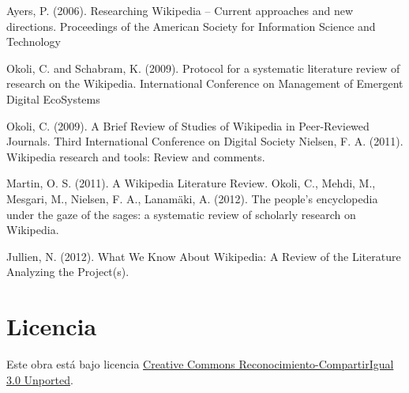 \documentclass[11pt,twocolumn]{article}
\begin{document}
Ayers, P. (2006). Researching Wikipedia -- Current approaches and new directions. Proceedings of the American Society for Information Science and Technology

Okoli, C. and Schabram, K. (2009). Protocol for a systematic literature review of research on the Wikipedia. International Conference on Management of Emergent Digital EcoSystems

Okoli, C. (2009). A Brief Review of Studies of Wikipedia in Peer-Reviewed Journals. Third International Conference on Digital Society
Nielsen, F. A. (2011). Wikipedia research and tools: Review and comments.

Martin, O. S. (2011). A Wikipedia Literature Review.
Okoli, C., Mehdi, M., Mesgari, M., Nielsen, F. A.,  Lanam\"{a}ki, A. (2012). The people's encyclopedia under the gaze of the sages: a systematic review of scholarly research on Wikipedia.

Jullien, N. (2012). What We Know About Wikipedia: A Review of the Literature Analyzing the Project(s).

\section{Licencia}
Este obra está bajo licencia \href{http://creativecommons.org/licenses/by-sa/3.0/}{Creative Commons Reconocimiento-CompartirIgual 3.0 Unported}.
\end{document}

